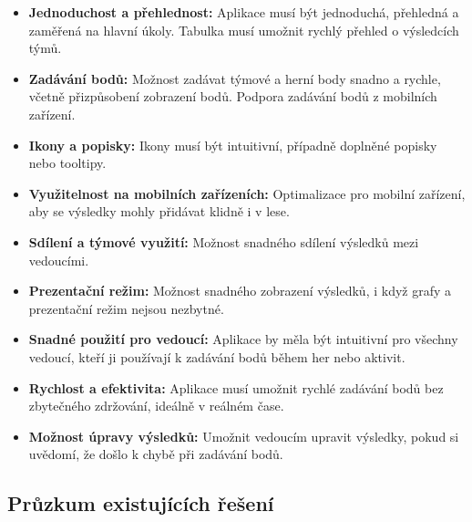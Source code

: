 \documentclass[a4paper, 12pt]{article} %
\begin{document}
\begin{itemize}
    \item \textbf{Jednoduchost a přehlednost:} Aplikace musí být jednoduchá, přehledná a 
    zaměřená na hlavní úkoly. Tabulka musí umožnit rychlý přehled o výsledcích týmů.
    
    \item \textbf{Zadávání bodů:} Možnost zadávat týmové a herní body snadno a rychle, včetně 
    přizpůsobení zobrazení bodů. Podpora zadávání bodů z mobilních zařízení.
    
    \item \textbf{Ikony a popisky:} Ikony musí být intuitivní, případně doplněné popisky nebo 
    tooltipy.
    
    \item \textbf{Využitelnost na mobilních zařízeních:} Optimalizace pro mobilní zařízení, 
    aby se výsledky mohly přidávat klidně i v lese.
    
    \item \textbf{Sdílení a týmové využití:} Možnost snadného sdílení výsledků mezi vedoucími.
    
    \item \textbf{Prezentační režim:} Možnost snadného zobrazení výsledků, i když grafy a 
    prezentační režim nejsou nezbytné.
    
    \item \textbf{Snadné použití pro vedoucí:} Aplikace by měla být intuitivní pro všechny 
    vedoucí, kteří ji používají k zadávání bodů během her nebo aktivit.
    
    \item \textbf{Rychlost a efektivita:} Aplikace musí umožnit rychlé zadávání bodů bez 
    zbytečného zdržování, ideálně v reálném čase.
    
    \item \textbf{Možnost úpravy výsledků:} Umožnit vedoucím upravit výsledky, pokud si 
    uvědomí, že došlo k chybě při zadávání bodů.
\end{itemize}

\subsection{Průzkum existujících řešení}
\end{document}

